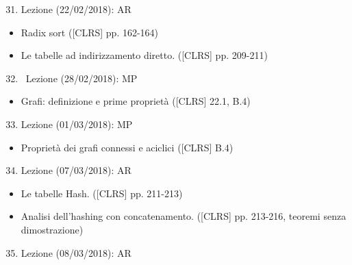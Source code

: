 \documentclass{article}
\providecommand{\tightlist}{%
  \setlength{\itemsep}{0pt}\setlength{\parskip}{0pt}}
\begin{document}
\begin{enumerate}
\setcounter{enumi}{30}
\tightlist
\item
  {Lezione (22/02/2018): AR}
\end{enumerate}

\begin{itemize}
\tightlist
\item
  {Radix sort ({[}CLRS{]} pp. 162-164)}
\item
  {Le tabelle ad indirizzamento diretto. ({[}CLRS{]} pp.
  209-211)}{~~~~~~~~}
\end{itemize}

\begin{enumerate}
\setcounter{enumi}{31}
\tightlist
\item
  {~Lezione (28/02/2018): MP}
\end{enumerate}

\begin{itemize}
\tightlist
\item
  {Grafi: definizione e prime proprietà ({[}CLRS{]} 22.1, B.4)}
\end{itemize}

\begin{enumerate}
\setcounter{enumi}{32}
\tightlist
\item
  {Lezione (01/03/2018): MP}
\end{enumerate}

\begin{itemize}
\tightlist
\item
  {Proprietà dei grafi connessi e aciclici ({[}CLRS{]} B.4)}
\end{itemize}

\begin{enumerate}
\setcounter{enumi}{33}
\tightlist
\item
  {Lezione (07/03/2018): AR}
\end{enumerate}

\begin{itemize}
\tightlist
\item
  {Le tabelle Hash. ({[}CLRS{]} pp. 211-213)}
\item
  {Analisi dell'hashing con concatenamento. ({[}CLRS{]} pp. 213-216,
  teoremi senza dimostrazione)\\
  }
\end{itemize}

\begin{enumerate}
\setcounter{enumi}{34}
\tightlist
\item
  {Lezione (08/03/2018): AR}
\end{enumerate}
\end{document}
